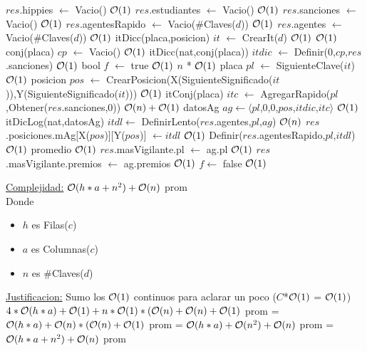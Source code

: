 \begin{Algoritmos}
\begin{algorithm}[H]
\begin{algorithmic}[1]
	\State $res$.hippies $\gets$ Vacio() \Comment $\mathcal{O}(1)$
	\State $res$.estudiantes $\gets$ Vacio() \Comment $\mathcal{O}(1)$
	\State $res$.sanciones $\gets$ Vacio() \Comment $\mathcal{O}(1)$
	\State $res$.agentesRapido $\gets$ Vacio($\#$Claves($d$)) \Comment $\mathcal{O}(1)$
	\State $res$.agentes $\gets$ Vacio($\#$Claves($d$)) \Comment $\mathcal{O}(1)$ %
	\State itDicc(placa,posicion) $it$ $\gets$ CrearIt($d$) \Comment $\mathcal{O}(1)$
	 \Comment $\mathcal{O}(1)$
		\State conj(placa) $cp$ $\gets$ Vacio() \Comment $\mathcal{O}(1)$
		\State itDicc(nat,conj(placa)) $itdic$ $\gets$ Definir(0,$cp$,$res$.sanciones) \Comment $\mathcal{O}(1)$
		\State bool $f$ $\gets$ true \Comment $\mathcal{O}(1)$
		 \Comment $n$ * $\mathcal{O}(1)$
	 	\State placa $pl$ $\gets$ SiguienteClave($it$) \Comment $\mathcal{O}(1)$
	 	\State posicion $pos$ $\gets$ CrearPosicion(X(SiguienteSignificado($it$)),Y(SiguienteSignificado($it$))) \Comment $\mathcal{O}(1)$
	 	\State itConj(placa) $itc$ $\gets$ AgregarRapido($pl$,Obtener($res$.sanciones,0)) \Comment $\mathcal{O}(n) + \mathcal{O}(1)$
	 	\State datosAg $ag \gets \langle pl$,0,0,$pos$,$itdic$,$itc \rangle$ \Comment $\mathcal{O}(1)$
	 	\State itDicLog(nat,datosAg) $itdl \gets$ DefinirLento($res$.agentes,$pl$,$ag$) \Comment $\mathcal{O}(n)$
	 	\State $res$.posiciones.mAg[X($pos$)][Y($pos$)] $\gets itdl$ \Comment $\mathcal{O}(1)$
	 	\State Definir($res$.agentesRapido,$pl$,$itdl$) \Comment $\mathcal{O}(1)$ promedio
	 	 \Comment $\mathcal{O}(1)$
	 		\State $res$.masVigilante.pl $\gets$ ag.pl \Comment $\mathcal{O}(1)$
	 		\State $res$.masVigilante.premios $\gets$ ag.premios \Comment $\mathcal{O}(1)$
	 		\State $f \gets$ false \Comment $\mathcal{O}(1)$
	 	\EndIf
	 \EndWhile
	 \EndIf
\EndProcedure
\end{algorithmic}

\underline{Complejidad:} $\mathcal{O}(h*a + n^2) + \mathcal{O}(n)$ prom\\
Donde 
\begin{itemize}
	\item $h$ es Filas($c$)
	\item $a$ es Columnas($c$)
	\item $n$ es $\#$Claves($d$)
\end{itemize}	
\underline{Justificacion:} Sumo los $\mathcal{O}(1)$ continuos para aclarar un poco ($C$*$\mathcal{O}(1)$ = $\mathcal{O}(1)$)\\
$4*\mathcal{O}(h*a) + \mathcal{O}(1) + n * \mathcal{O}(1) * (\mathcal{O}(n) + \mathcal{O}(n) + \mathcal{O}(1)$ prom = $\mathcal{O}(h*a) + \mathcal{O}(n)*(\mathcal{O}(n) + \mathcal{O}(1)$ prom = $\mathcal{O}(h*a) + \mathcal{O}(n^2) + \mathcal{O}(n)$ prom = $\mathcal{O}(h*a + n^2) + \mathcal{O}(n)$ prom
\end{algorithm}



\end{Algoritmos}
